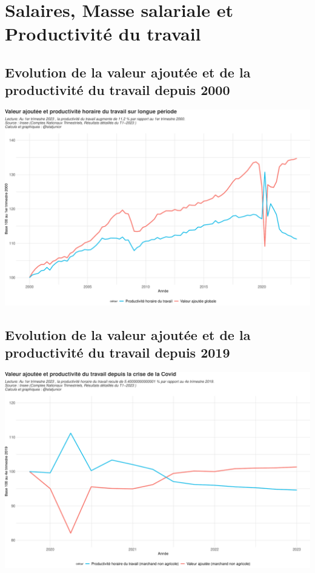 \documentclass[
  paper=a4,
  ,captions=tableheading
]{scrartcl}
\begin{document}
\newpage

\hypertarget{salaires-masse-salariale-et-productivituxe9-du-travail}{%
\section{Salaires, Masse salariale et Productivité du
travail}\label{salaires-masse-salariale-et-productivituxe9-du-travail}}

\hypertarget{evolution-de-la-valeur-ajoutuxe9e-et-de-la-productivituxe9-du-travail-depuis-2000}{%
\subsection{Evolution de la valeur ajoutée et de la productivité du
travail depuis
2000}\label{evolution-de-la-valeur-ajoutuxe9e-et-de-la-productivituxe9-du-travail-depuis-2000}}

\includegraphics{rapport_pdf_compte_branche_files/figure-latex/unnamed-chunk-10-1.pdf}

\hypertarget{evolution-de-la-valeur-ajoutuxe9e-et-de-la-productivituxe9-du-travail-depuis-2019}{%
\subsection{Evolution de la valeur ajoutée et de la productivité du
travail depuis
2019}\label{evolution-de-la-valeur-ajoutuxe9e-et-de-la-productivituxe9-du-travail-depuis-2019}}

\includegraphics{rapport_pdf_compte_branche_files/figure-latex/unnamed-chunk-11-1.pdf}
\end{document}
